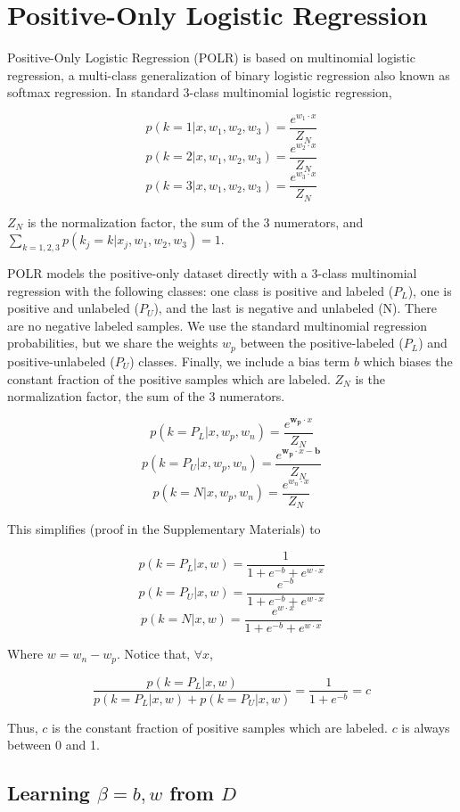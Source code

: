 \documentclass{article}
\begin{document}
\section{Positive-Only Logistic Regression}

Positive-Only Logistic Regression (POLR) is based on multinomial logistic regression, a multi-class generalization of binary logistic regression also known as softmax regression.  In standard 3-class multinomial logistic regression,

$$p(k=1 | x, w_1, w_2, w_3) =  \frac{e^{w_1 \cdot x}}{Z_N}$$
$$p(k=2 | x, w_1, w_2, w_3) =  \frac{e^{w_2 \cdot x}}{Z_N}$$
$$p(k=3 | x, w_1, w_2, w_3) =  \frac{e^{w_3 \cdot x}}{Z_N}$$

$Z_N$ is the normalization factor, the sum of the 3 numerators, and $\sum_{k=1,2,3}{p(k_j=k|x_j, w_1, w_2, w_3)} = 1$.

POLR models the positive-only dataset directly with a 3-class multinomial regression with the following classes: one class is positive and labeled ($P_L$), one is positive and unlabeled ($P_U$), and the last is negative and unlabeled (N).  There are no negative labeled samples.  We use the standard multinomial regression probabilities, but we share the weights $w_p$ between the positive-labeled ($P_L$) and positive-unlabeled ($P_U$) classes. Finally, we include a bias term $b$ which biases the constant fraction of the positive samples which are labeled.  $Z_N$ is the normalization factor, the sum of the 3 numerators.

$$p(k=P_L | x, w_p, w_n) =  \frac{e^{\mathbf{w_p} \cdot x}}{Z_N}$$
$$p(k=P_U | x, w_p, w_n) =  \frac{e^{\mathbf{w_p} \cdot x - \mathbf{b}}}{Z_N}$$
$$p(k=N | x, w_p, w_n) =  \frac{e^{w_n \cdot x}}{Z_N}$$

This simplifies (proof in the Supplementary Materials) to

$$ p(k=P_L | x, w) = \frac{1}{1 + e^{-b} + e^{w \cdot x}}$$
$$ p(k=P_U | x, w) =  \frac{e^{-b}}{1 + e^{-b} + e^{w \cdot x}}$$
$$ p(k=N | x, w) = \frac{e^{w \cdot x}}{1 + e^{-b} + e^{w \cdot x}}$$

Where $w = w_n - w_p$. Notice that, $\forall x$,

$$\frac{p(k=P_L | x, w)}{p(k=P_L | x, w) + p(k=P_U | x, w)} = \frac{1}{1 + e^{-b}} = c$$

Thus, $c$ is the constant fraction of positive samples which are labeled. $c$ is always between 0 and 1.

\subsection{Learning $\beta = b, w$ from $D$}
\end{document}
